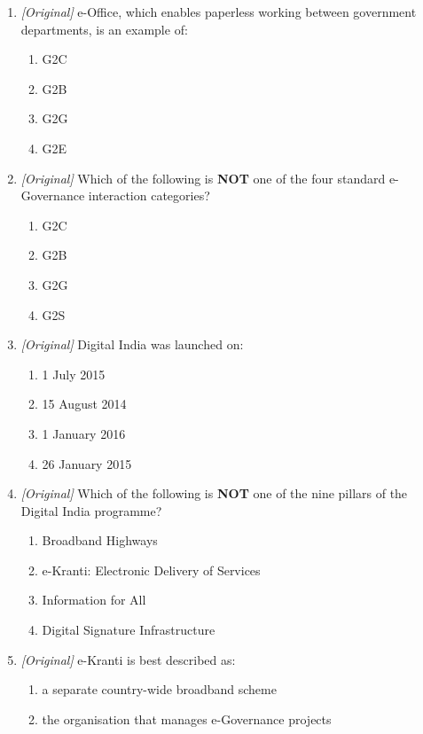 \begin{enumerate}[label=\textbf{Q\arabic*.}, leftmargin=*]
\begin{enumerate}[label=\Alph*.]
    \item G2E
  \end{enumerate}
\item \textit{[Original]} e-Office, which enables paperless working between
  government departments, is an example of:
  \begin{enumerate}[label=\Alph*.]
    \item G2C
    \item G2B
    \item G2G
    \item G2E
  \end{enumerate}
\item \textit{[Original]} Which of the following is \textbf{NOT} one of the
  four standard e-Governance interaction categories?
  \begin{enumerate}[label=\Alph*.]
    \item G2C
    \item G2B
    \item G2G
    \item G2S
  \end{enumerate}
\item \textit{[Original]} Digital India was launched on:
  \begin{enumerate}[label=\Alph*.]
    \item 1 July 2015
    \item 15 August 2014
    \item 1 January 2016
    \item 26 January 2015
  \end{enumerate}
\item \textit{[Original]} Which of the following is \textbf{NOT} one of the
  nine pillars of the Digital India programme?
  \begin{enumerate}[label=\Alph*.]
    \item Broadband Highways
    \item e-Kranti: Electronic Delivery of Services
    \item Information for All
    \item Digital Signature Infrastructure
  \end{enumerate}
\item \textit{[Original]} e-Kranti is best described as:
  \begin{enumerate}[label=\Alph*.]
    \item a separate country-wide broadband scheme
    \item the organisation that manages e-Governance projects

\end{enumerate}
\end{enumerate}
